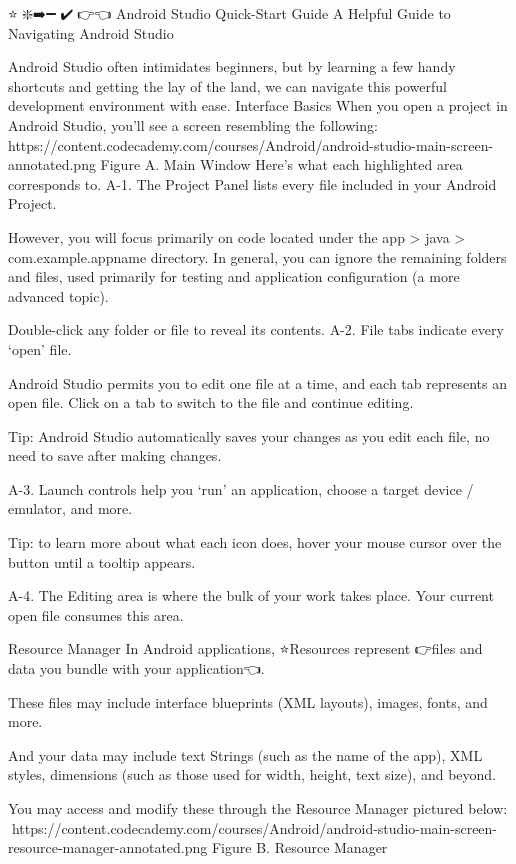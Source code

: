 ⭐🎨❇️➡️➖💎✔️🔗👉👈
Android Studio Quick-Start Guide
        A Helpful Guide to Navigating Android Studio

        Android Studio often intimidates beginners, but by learning a few handy shortcuts and getting the lay of the land, we can navigate this powerful development environment with ease.
Interface Basics
        When you open a project in Android Studio, you’ll see a screen resembling the following:
            🎨https://content.codecademy.com/courses/Android/android-studio-main-screen-annotated.png
                Figure A. Main Window
        Here’s what each highlighted area corresponds to.
            A-1. The Project Panel lists every file included in your Android Project.
        
        However, you will focus primarily on code located under the app > java > {com}.{example}.{appname} directory. In general, you can ignore the remaining folders and files, used primarily for testing and application configuration (a more advanced topic).

        Double-click any folder or file to reveal its contents.
            A-2. File tabs indicate every ‘open’ file.
    
        Android Studio permits you to edit one file at a time, and each tab represents an open file. Click on a tab to switch to the file and continue editing.

            Tip: Android Studio automatically saves your changes as you edit each file, no need to save after making changes.

            A-3. Launch controls help you ‘run’ an application, choose a target device / emulator, and more.
        
            Tip: to learn more about what each icon does, hover your mouse cursor over the button until a tooltip appears.

            A-4. The Editing area is where the bulk of your work takes place. Your current open file consumes this area.

    Resource Manager
        In Android applications, ⭐Resources represent 👉files and data you bundle with your application👈.

        These files may include interface blueprints (XML layouts), images, fonts, and more.

        And your data may include text Strings (such as the name of the app), XML styles, dimensions (such as those used for width, height, text size), and beyond.

        You may access and modify these through the Resource Manager pictured below:
            🎨https://content.codecademy.com/courses/Android/android-studio-main-screen-resource-manager-annotated.png
                Figure B. Resource Manager

